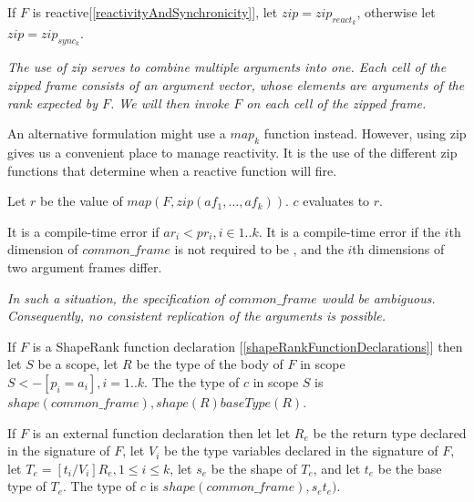 \documentclass{article}
\begin{document}
If $F$ is reactive[\ref{reactivityAndSynchronicity}], let $zip = zip_{react_k}$, otherwise let $zip = zip_{sync_k}$.

{\em
The use of zip serves to combine multiple arguments into one.  
Each cell of the zipped frame consists of an argument vector, whose elements are arguments of the rank expected by $F$.
We will then invoke $F$ on each cell of the zipped frame.

An alternative formulation might use a $map_k$ function instead.
However, using zip gives us a convenient place to manage reactivity.
It is the use of the different zip functions that determine when a reactive function will fire. 
}

Let $r$ be the value of $map(F, zip(af_1, \ldots, af_k))$. $c$ evaluates to $r$.

It is a compile-time error if $ar_i < pr_i, i \in 1..k$. It is a compile-time error if the $i$th dimension of  $common\_frame$ is not required to be  \QUESTIONMARK{}, and the $i$th dimensions of two argument frames differ. 

{\em In such a situation, the specification of $common\_frame$ would be ambiguous. Consequently, no consistent replication of the arguments is possible.}

If $F$ is a ShapeRank function declaration [\ref{shapeRankFunctionDeclarations}] then
let $S$ be a scope, let $R$ be the type of the body of $F$ in scope $S <- [p_i = a_i], i = 1..k$. The the type of $c$ in scope $S$ is
$shape(common\_frame), shape(R) baseType(R)$.


If $F$ is an external function declaration then let let $R_e$ be the return type declared in the signature of $F$,  let $V_i$ be the type variables declared in the signature of $F$, let 
$T_e = [t_i/V_i]R_e, 1 \le i \le k$, let $s_e$ be the shape of $T_e$, and let $t_e$ be the base type of $T_e$.
The type of $c$ is
$shape(common\_frame), s_e t_e)$.
\end{document}
